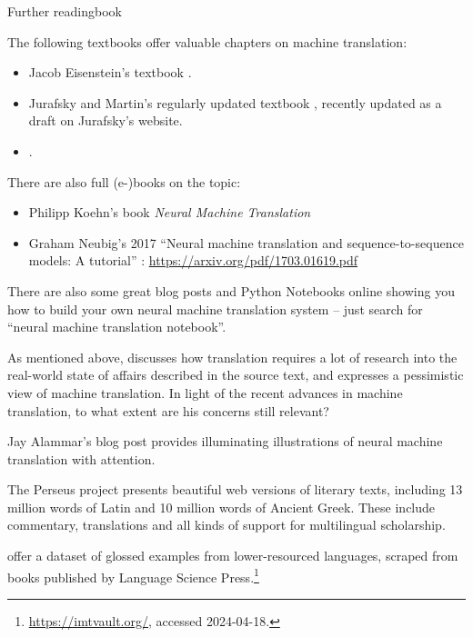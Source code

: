 \begin{tblsfilledsymbol}{Further reading}{book}
    
The following textbooks offer valuable chapters on machine translation:

\begin{itemize}

\item Jacob Eisenstein's  textbook \citep{Eisenstein:2019}.

\item Jurafsky and Martin's regularly updated textbook \citet{Jurafsky.Martin-09}, recently updated as a draft on Jurafsky's website.

\item {} \citep{LanguageFiles13}.

\end{itemize}

There are also full (e-)books on the topic:

\begin{itemize}

\item Philipp Koehn's  book \textit{Neural Machine Translation}  \citep{Koehn:2020}

\item Graham Neubig's  2017 ``Neural machine translation and sequence-to-sequence models: A tutorial'' : \url{https://arxiv.org/pdf/1703.01619.pdf} \citep{Neubig:2017}

\end{itemize}

There are also some great blog posts and Python Notebooks online showing you how to build your own neural machine translation system -- just search for ``neural machine translation notebook''.

As mentioned above, \citet{Piron:1988} discusses how translation requires a lot of research into the real-world state of affairs described in the source text, and expresses a pessimistic view of machine translation.  In light of the recent advances in machine translation, to what extent are his concerns still relevant?

Jay Alammar's blog post \citep{Alammar:2018} provides illuminating illustrations of neural machine translation with attention.



The Perseus project \citep{perseus} presents beautiful web versions of
literary texts, including 13 million words of Latin and 10 million
words of Ancient Greek. These include commentary, translations and all
kinds of support for multilingual scholarship.

\citet{NordhoffKramer:2022} offer a dataset of glossed examples from lower-resourced languages, scraped from books published by Language Science Press.\footnote{\url{https://imtvault.org/}, accessed 2024-04-18.}

\end{tblsfilledsymbol}
